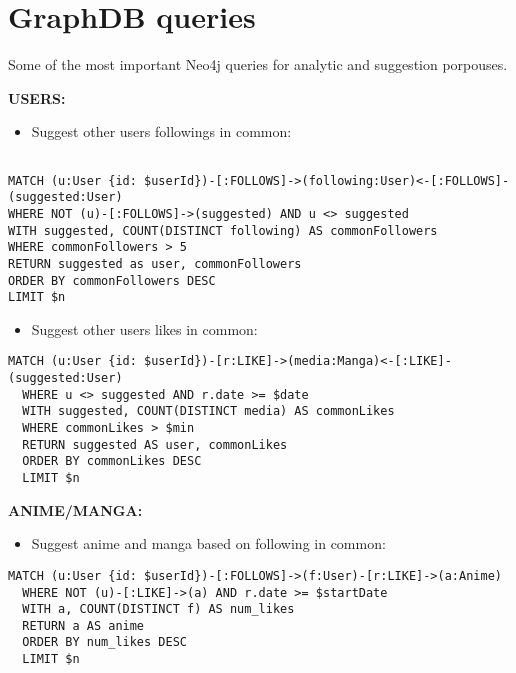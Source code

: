 \section{GraphDB queries}
Some of the most important Neo4j queries for analytic and suggestion porpouses.

\textbf{USERS:}

\begin{itemize}
  \item Suggest other users followings in common:
\end{itemize}
\begin{lstlisting}[language=Cypher, caption=SuggestUsersByCommonFollowings]

MATCH (u:User {id: $userId})-[:FOLLOWS]->(following:User)<-[:FOLLOWS]-(suggested:User) 
WHERE NOT (u)-[:FOLLOWS]->(suggested) AND u <> suggested 
WITH suggested, COUNT(DISTINCT following) AS commonFollowers 
WHERE commonFollowers > 5 
RETURN suggested as user, commonFollowers 
ORDER BY commonFollowers DESC 
LIMIT $n
\end{lstlisting}

\begin{itemize}
  \item Suggest other users likes in common:
\end{itemize}
\begin{lstlisting}[language=Cypher, caption=SuggestUsersByCommonLikes]
  MATCH (u:User {id: $userId})-[r:LIKE]->(media:Manga)<-[:LIKE]-(suggested:User) 
  WHERE u <> suggested AND r.date >= $date
  WITH suggested, COUNT(DISTINCT media) AS commonLikes
  WHERE commonLikes > $min
  RETURN suggested AS user, commonLikes
  ORDER BY commonLikes DESC
  LIMIT $n
\end{lstlisting}



\textbf{ANIME/MANGA:}

\begin{itemize}
  \item Suggest anime and manga based on following in common:
\end{itemize}
\begin{lstlisting}[language=Cypher, caption=GetSuggestedByFollowings]
  MATCH (u:User {id: $userId})-[:FOLLOWS]->(f:User)-[r:LIKE]->(a:Anime)
  WHERE NOT (u)-[:LIKE]->(a) AND r.date >= $startDate
  WITH a, COUNT(DISTINCT f) AS num_likes
  RETURN a AS anime
  ORDER BY num_likes DESC
  LIMIT $n
  
\end{lstlisting}


